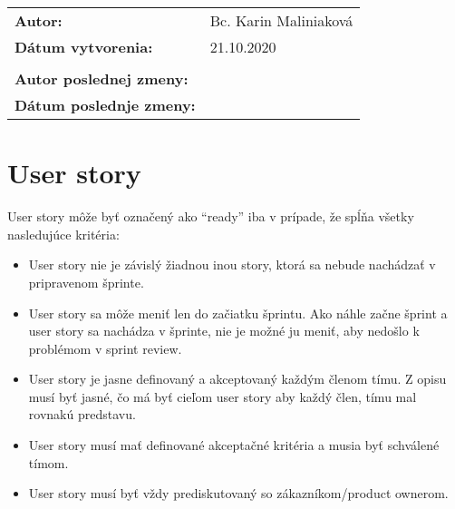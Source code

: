\documentclass{article}
\begin{document}
    

    \begin{table}[h]
        \begin{tabular}{ll}
            \textbf{Autor:} & Bc. Karin Maliniaková \\
            \textbf{Dátum vytvorenia:} & 21.10.2020 \\
            \\
            \textbf{Autor poslednej zmeny:} &  \\
            \textbf{Dátum poslednje zmeny:} &  \\
            \hline
        \end{tabular}
        \label{tab:grades}
    \end{table}

    \section*{User story}

    \textnormal{User story môže byť označený ako “ready” iba v prípade, že spĺňa všetky nasledujúce kritéria:}

    \begin{itemize}
        \item User story nie je závislý žiadnou inou story, ktorá sa nebude nachádzať v pripravenom šprinte.
        \item User story sa môže meniť len do začiatku šprintu. Ako náhle začne šprint a user story sa nachádza v šprinte, nie je možné ju meniť, aby nedošlo k problémom v sprint review.
        \item User story je jasne definovaný a akceptovaný každým členom tímu. Z opisu musí byť jasné, čo má byť cieľom user story aby každý člen, tímu mal rovnakú predstavu.
        \item User story musí mať definované akceptačné kritéria a musia byť schválené tímom.
        \item User story musí byť vždy prediskutovaný so zákazníkom/product ownerom.
    \end{itemize}
\end{document}
